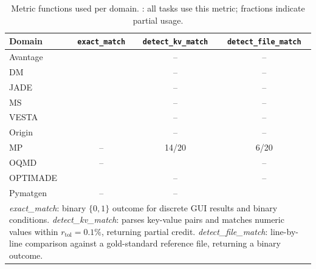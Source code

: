 \documentclass{article}
\newcommand{\cmark}{\checkmark}
\begin{document}
\begin{table}[ht]
\centering
\caption{Metric functions used per domain. \cmark: all tasks use this metric;
fractions indicate partial usage.}
\label{tab:eval-metrics}
\small
\begin{tabular}{lccc}
\toprule
\textbf{Domain} & \texttt{exact\_match} & \texttt{detect\_kv\_match} & \texttt{detect\_file\_match} \\
\midrule
Avantage  & \cmark & --     & --     \\
DM        & \cmark & --     & --     \\
JADE      & \cmark & --     & --     \\
MS        & \cmark & --     & --     \\
VESTA     & \cmark & --     & --     \\
Origin    & \cmark & --     & --     \\
MP        & --     & 14/20  & 6/20   \\
OQMD      & --     & \cmark & --     \\
OPTIMADE  & \cmark & --     & --     \\
Pymatgen  & --     & --     & \cmark \\
\bottomrule
\multicolumn{4}{p{0.85\columnwidth}}{%
\footnotesize
\textit{exact\_match}: binary $\{0,1\}$ outcome for discrete GUI results and
binary conditions. \quad
\textit{detect\_kv\_match}: parses key-value pairs and matches numeric values
within $r_\text{tol}=0.1\%$, returning partial credit. \quad
\textit{detect\_file\_match}: line-by-line comparison against a gold-standard
reference file, returning a binary outcome.}
\end{tabular}
\end{table}
\end{document}
